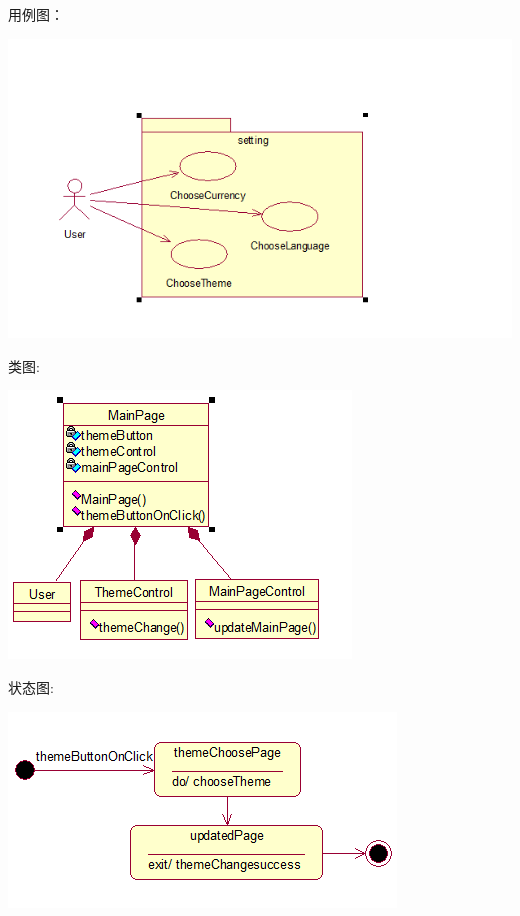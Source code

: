 \documentclass[11pt]{article}
\begin{document}
			用例图：
			\begin{center}
			\includegraphics[scale=0.42]{setting部分用例图.png}
			\end{center}

			类图: 
			\begin{center}
			\includegraphics[scale=0.42]{选择主题类图.png}
			\end{center}

			状态图: 
			\begin{center}
			\includegraphics[scale=0.42]{选择主题状态图.png}
			\end{center}
\end{document}
